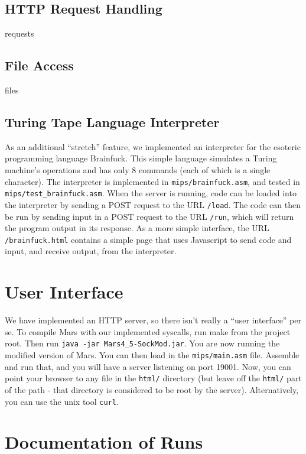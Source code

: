 \documentclass[journal,10pt]{IEEEtran}
\begin{document}
\subsection{HTTP Request Handling}

requests

\subsection{File Access}

files

\subsection{Turing Tape Language Interpreter}

As an additional ``stretch'' feature, we implemented an interpreter for the
esoteric programming language Brainfuck\cite{Mpreu/preller}.  This simple
language simulates a Turing machine's operations and has only 8 commands (each
of which is a single character).  The interpreter is implemented in
\texttt{mips/brainfuck.asm}, and tested in \texttt{mips/test\_brainfuck.asm}.
When the server is running, code can be loaded into the interpreter by sending a
POST request to the URL \texttt{/load}.  The code can then be run by sending
input in a POST request to the URL \texttt{/run}, which will return the program
output in its response.  As a more simple interface, the URL
\texttt{/brainfuck.html} contains a simple page that uses Javascript to send
code and input, and receive output, from the interpreter.

\section{User Interface}

We have implemented an HTTP server, so there isn’t really a “user interface” per se. To compile Mars with our implemented syscalls, run make from the project root. Then run \texttt{java -jar Mars4\_5-SockMod.jar}. You are now running the modified version of Mars. You can then load in the \texttt{mips/main.asm} file. Assemble and run that, and you will have a server listening on port 19001. Now, you can point your browser to any file in the \texttt{html/} directory (but leave off the \texttt{html/} part of the path - that directory is considered to be root by the server). Alternatively, you can use the unix tool \texttt{curl}.

\section{Documentation of Runs}
\end{document}
